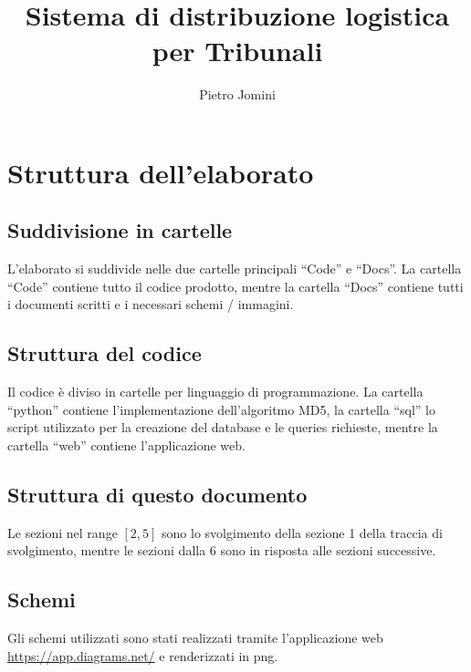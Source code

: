 \documentclass[11pt]{article}
\title{Sistema di distribuzione logistica per Tribunali}
\author{Pietro Jomini}
\date{}
\begin{document}
\maketitle
\newpage
\tableofcontents
\newpage
{}

\section{Struttura dell'elaborato}
\subsection{Suddivisione in cartelle}

L'elaborato si suddivide nelle due cartelle principali ``Code'' e ``Docs''. La cartella ``Code'' contiene tutto il codice prodotto, mentre la cartella ``Docs'' contiene tutti i documenti scritti e i necessari schemi / immagini.

\subsection{Struttura del codice}

Il codice è diviso in cartelle per linguaggio di programmazione. La cartella ``python'' contiene l'implementazione dell'algoritmo MD5, la cartella ``sql'' lo script utilizzato per la creazione del database e le queries richieste, mentre la cartella ``web'' contiene l'applicazione web.

\subsection{Struttura di questo documento}

Le sezioni nel range $[2, 5]$ sono lo svolgimento della sezione 1 della traccia di svolgimento, mentre le sezioni dalla 6 sono in risposta alle sezioni successive.

\subsection{Schemi}

Gli schemi utilizzati sono stati realizzati tramite l'applicazione web \url{https://app.diagrams.net/} e renderizzati in png.

\newpage


\end{document}
